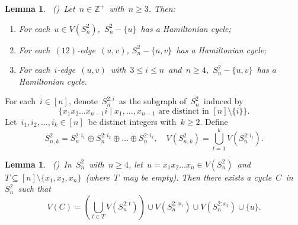 \documentclass[12pt,a4paper]{amsart}
\newtheorem{lemma}[thm]{Lemma}
\theoremstyle{definition}
\begin{document}
	
	\begin{lemma}\label{5}
		~(\cite{Li25})~Let~$n\in\mathbb{Z}^+$~with~$n\ge3$. Then:
		\begin{enumerate}[label=(\roman*)]
			\item\label{5-1} For each~$u\in V(S_n^2)$,~$S_n^2-\{u\}$~has a Hamiltonian cycle;
			\item\label{5-2} For each~$(12)$-edge~$(u,v)$, $S_n^2-\{u,v\}$~has a Hamiltonian cycle;
			\item\label{5-3} For each~$i$-edge~$(u,v)$~with~$3\le i\le n$~and~$n\ge4$,~$S_n^2-\{u,v\}$~has a Hamiltonian cycle.
		\end{enumerate}
	\end{lemma}
	
	
		For each~$i\in[n]$, denote~$S_n^{2:i}$~as the subgraph of~$S_n^2$~induced by
		\[
		\{x_1x_2\dots x_{n-1}i\mid x_1,\dots,x_{n-1}\text{ are distinct in }[n]\setminus\{i\}\}.
		\]
		Let~$i_1,i_2,\dots,i_k\in[n]$~be distinct integers with~$k\ge2$. Define
		\[
		S_{n,k}^2=S_n^{2:i_1}\oplus S_n^{2:i_2}\oplus\dots\oplus S_n^{2:i_k},\quad V(	S_{n,k}^2)=\bigcup_{t=1}^{k}V(S_n^{2:i_t}).
		\]

	\begin{lemma}\label{6}
		~(\cite{Li25})~In~$S_n^2$~with~$n\ge4$, let~$u=x_1x_2\dots x_n\in V(S_n^2)$~and~$T\subseteq[n]\setminus\{x_1,x_2,x_n\}$~(where~$T$~may be empty). Then there exists a cycle~$C$~in~$S_n^2$~such that
		\[
		V(C)=\left(\bigcup_{t\in T}V(S_n^{2:t})\right)\cup V(S_n^{2:x_1})\cup V(S_n^{2:x_2})\cup\{u\}.
		\]
	\end{lemma}
\end{document}
